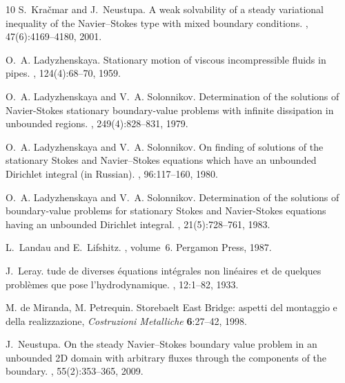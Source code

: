 \documentclass[11pt]{article}
\numberwithin{equation}{section}
\numberwithin{figure}{section}
\begin{document}
\begin{thebibliography}{10}
S.~Kra{\v{c}}mar and J.~Neustupa.
\newblock A weak solvability of a steady variational inequality of the
  {N}avier--{S}tokes type with mixed boundary conditions.
,
  47(6):4169--4180, 2001.

O.~A. Ladyzhenskaya.
\newblock Stationary motion of viscous incompressible fluids in pipes.
, 124(4):68--70, 1959.

O.~A. Ladyzhenskaya and V.~A. Solonnikov.
\newblock Determination of the solutions of {N}avier-{S}tokes stationary
  boundary-value problems with infinite dissipation in unbounded regions.
, 249(4):828--831, 1979.

O.~A. Ladyzhenskaya and V.~A. Solonnikov.
\newblock On finding of solutions of the stationary {S}tokes and
  {N}avier--{S}tokes equations which have an unbounded {D}irichlet integral (in
  {R}ussian).
, 96:117--160, 1980.

O.~A. Ladyzhenskaya and V.~A. Solonnikov.
\newblock Determination of the solutions of boundary-value problems for
  stationary {S}tokes and {N}avier-{S}tokes equations having an unbounded
  {D}irichlet integral.
, 21(5):728--761, 1983.

L.~Landau and E.~Lifshitz.
, volume~6.
\newblock Pergamon Press, 1987.

J.~Leray.
tude de diverses {\'e}quations int{\'e}grales non lin{\'e}aires
  et de quelques probl{\`e}mes que pose l'hydrodynamique.
, 12:1--82,
  1933.
 
 
   M. de Miranda, M. Petrequin. Storebaelt East Bridge: aspetti del montaggio e della realizzazione, {\it Costruzioni Metalliche} {\bf6}:27--42, 1998.

  

J.~Neustupa.
\newblock On the steady {N}avier--{S}tokes boundary value problem in an
  unbounded 2{D} domain with arbitrary fluxes through the components of the
  boundary.
, 55(2):353--365, 2009.


\end{thebibliography}
\end{document}
